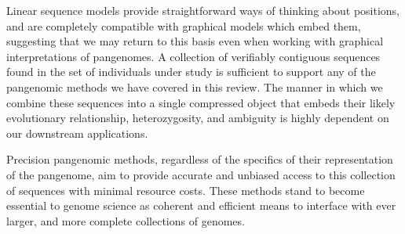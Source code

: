 Linear sequence models provide straightforward ways of thinking about positions, and are completely compatible with graphical models which embed them, suggesting that we may return to this basis even when working with graphical interpretations of pangenomes.
A collection of verifiably contiguous sequences found in the set of individuals under study is sufficient to support any of the pangenomic methods we have covered in this review.
The manner in which we combine these sequences into a single compressed object that embeds their likely evolutionary relationship, heterozygosity, and ambiguity is highly dependent on our downstream applications.

Precision pangenomic methods, regardless of the specifics of their representation of the pangenome, aim to provide accurate and unbiased access to this collection of sequences with minimal resource costs.
These methods stand to become essential to genome science as coherent and efficient means to interface with ever larger, and more complete collections of genomes.








